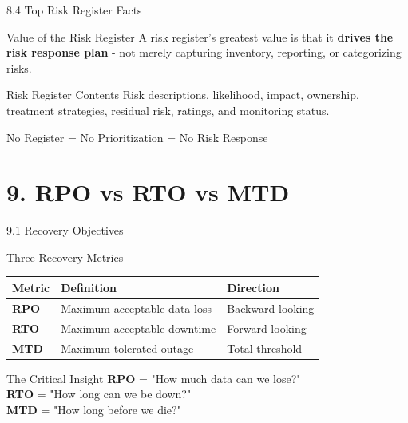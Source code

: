 \documentclass{beamer}
\begin{document}
	\begin{frame}{8.4 Top Risk Register Facts}
		\begin{block}{Value of the Risk Register}
			A risk register's greatest value is that it \textbf{drives the risk response plan} - not merely capturing inventory, reporting, or categorizing risks.
		\end{block}
		
		\begin{alertblock}{Risk Register Contents}
			Risk descriptions, likelihood, impact, ownership, treatment strategies, residual risk, ratings, and monitoring status.
		\end{alertblock}
		
		\begin{exampleblock}{No Register = No Prioritization = No Risk Response}
		\end{exampleblock}
	\end{frame}
	
	\section{9. RPO vs RTO vs MTD}
	
	\begin{frame}{9.1 Recovery Objectives}
		\begin{block}{Three Recovery Metrics}
			\begin{tabular}{|p{2.5cm}|p{4cm}|p{4.5cm}|}
				\hline
				\textbf{Metric} & \textbf{Definition} & \textbf{Direction} \\
				\hline
				\textbf{RPO} & Maximum acceptable data loss & Backward-looking \\
				\hline
				\textbf{RTO} & Maximum acceptable downtime & Forward-looking \\
				\hline
				\textbf{MTD} & Maximum tolerated outage & Total threshold \\
				\hline
			\end{tabular}
		\end{block}
		
		\begin{alertblock}{The Critical Insight}
			\textbf{RPO} = "How much data can we lose?" \\
			\textbf{RTO} = "How long can we be down?" \\
			\textbf{MTD} = "How long before we die?"
		\end{alertblock}
	\end{frame}
	
\end{document}
